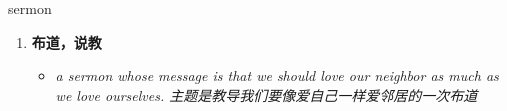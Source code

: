 
\begin{frame}
{\huge sermon}
\begin{center}
\begin{enumerate}\Large
  \item \textbf{布道，说教}
  \begin{itemize}
    \item \em{\Large{a sermon whose message is that we should love our neighbor as much as we love ourselves. 主题是教导我们要像爱自己一样爱邻居的一次布道}}
  \end{itemize}
\end{enumerate}
\end{center}
\end{frame}
